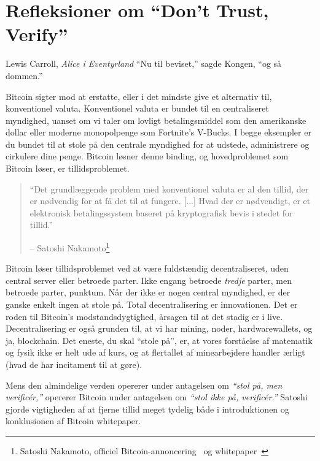 \chapter{Refleksioner om \enquote{Don't Trust, Verify}}
\label{les:16}

\begin{chapquote}{Lewis Carroll, \textit{Alice i Eventyrland}}
\enquote{Nu til beviset,} sagde Kongen, \enquote{og så dommen.}
\end{chapquote}

Bitcoin sigter mod at erstatte, eller i det mindste give et alternativ til,
konventionel valuta. Konventionel valuta er bundet til en centraliseret
myndighed, uanset om vi taler om lovligt betalingsmiddel som den amerikanske
dollar eller moderne monopolpenge som Fortnite's V-Bucks. I begge
eksempler er du bundet til at stole på den centrale myndighed for at udstede, administrere
og cirkulere dine penge. Bitcoin løsner denne binding, og hovedproblemet
som Bitcoin løser, er tillidsproblemet.

\begin{quotation}\begin{samepage}
\enquote{Det grundlæggende problem med konventionel valuta er al den tillid, der er nødvendig for at få det til at fungere. [...] Hvad der er nødvendigt, er et elektronisk betalingssystem baseret på kryptografisk bevis i stedet for tillid.}
\begin{flushright} -- Satoshi Nakamoto\footnote{Satoshi Nakamoto, officiel Bitcoin-annoncering~\cite{bitcoin-announcement} og whitepaper~\cite{whitepaper}}
\end{flushright}\end{samepage}\end{quotation}

Bitcoin løser tillidsproblemet ved at være fuldstændig decentraliseret,
uden central server eller betroede parter. Ikke engang betroede \textit{tredje}
parter, men betroede parter, punktum. Når der ikke er nogen central
myndighed, er der ganske enkelt ingen at stole på. Total decentralisering
er innovationen. Det er roden til Bitcoin's modstandsdygtighed, årsagen
til at det stadig er i live. Decentralisering er også grunden til, at vi har mining,
noder, hardwarewallets, og ja, blockchain. Det eneste, du
skal \enquote{stole på}, er, at vores forståelse af matematik og fysik
ikke er helt ude af kurs, og at flertallet af minearbejdere handler ærligt (hvad de har incitament til at gøre).

Mens den almindelige verden opererer under antagelsen om \textit{\enquote{stol
på, men verificér,}} opererer Bitcoin under antagelsen om \textit{\enquote{stol
ikke på, verificér.}} Satoshi gjorde vigtigheden af at fjerne tillid meget tydelig både i
introduktionen og konklusionen af Bitcoin whitepaper.

